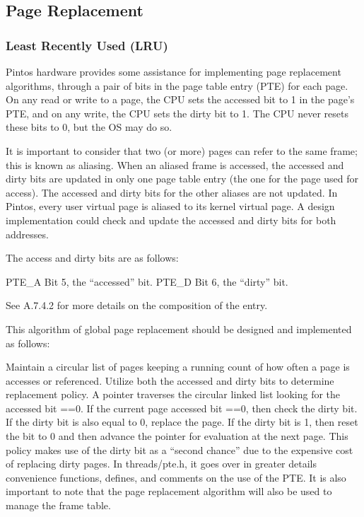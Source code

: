 \documentclass[11pt, letterpaper]{article}
\begin{document}
\subsection{Page Replacement}

\subsubsection{Least Recently Used (LRU)}

Pintos hardware provides some assistance for implementing page replacement algorithms, through a pair of bits in the page table entry (PTE) for each page. On any read or write to a page, the CPU sets the accessed bit to 1 in the page’s PTE, and on any write, the CPU sets the dirty bit to 1. The CPU never resets these bits to 0, but the OS may do so. 

It is important to consider that two (or more) pages can refer to the same frame; this is known as aliasing. When an aliased frame is accessed, the accessed and dirty bits are updated in only one page table entry (the one for the page used for access). The accessed and dirty bits for the other aliases are not updated. In Pintos, every user virtual page is aliased to its kernel virtual page. A design implementation could check and update the accessed and dirty bits for both addresses.

          The access and dirty bits are as follows: 

PTE\_A Bit 5, the “accessed” bit.
PTE\_D Bit 6, the “dirty” bit. 

See A.7.4.2 for more details on the composition of the entry.

This algorithm of global page replacement should be designed and implemented 
as follows: 
    
Maintain a circular list of pages keeping a running count of how often a page is  accesses or referenced. Utilize both the accessed and dirty bits to determine replacement policy. A pointer traverses the circular linked list looking for the accessed bit ==0. If the current page accessed bit ==0, then check the dirty bit. If the dirty bit is also equal to 0, replace the page. If the dirty bit is 1, then reset the bit to 0 and then advance the pointer for evaluation at the next page. This policy makes use of the dirty bit as a “second chance” due to the expensive cost of replacing dirty pages.  In threads/pte.h, it goes over in greater details convenience functions, defines, and comments on the use of the PTE.
    It is also important to note that the page replacement algorithm will also be used 
to manage the frame table.
\end{document}
